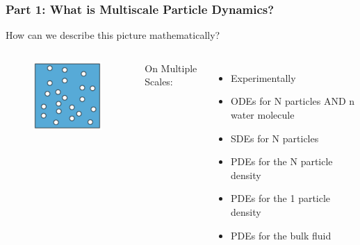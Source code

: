 \documentclass[aspectratio=169,xcolor=dvipsnames]{beamer}
\begin{document}
\begin{frame}
	\frametitle{Part 1: What is Multiscale Particle Dynamics?}
	How can we describe this picture mathematically?
	\vspace{1cm}
	\begin{columns}

	\begin{figure}
		\includegraphics[width=4cm]{Particles3.png}
	\end{figure}
		On Multiple Scales:
		\begin{itemize}
			\item Experimentally 
			\item ODEs for N particles AND n water molecule
			\item SDEs for N particles
			\item PDEs for the N particle density 
			\item PDEs for the 1 particle density 
			\item PDEs for the bulk fluid
		\end{itemize}
	\end{columns}
\end{frame}
\end{document}
